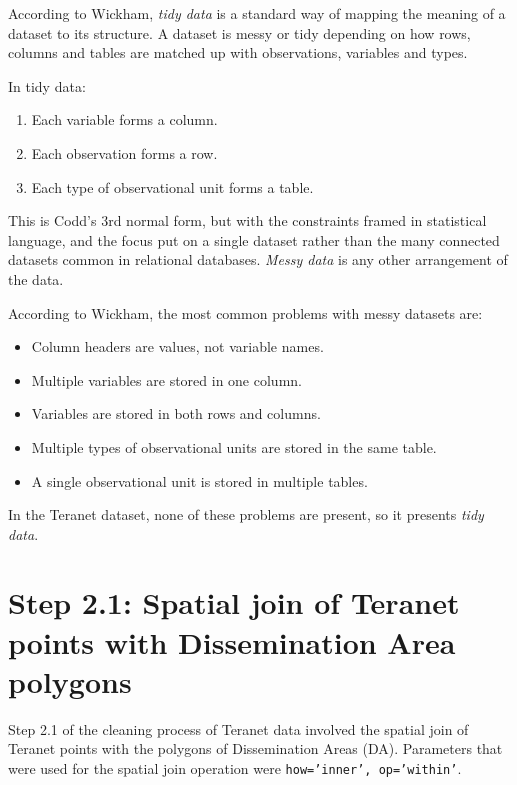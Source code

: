 \documentclass[11pt]{article}
\begin{document}
    According to Wickham\cite{Wickham2014}, \textit{tidy data} is a standard way of mapping the meaning of a dataset to its structure.
    A dataset is messy or tidy depending on how rows, columns and tables are matched up with observations,
    variables and types.

    \vspace{5mm}

    In tidy data:
    \begin{enumerate}
        \item Each variable forms a column.
        \item Each observation forms a row.
        \item Each type of observational unit forms a table.
    \end{enumerate}

    This is Codd's 3rd normal form\cite{Codd1990}, but with the constraints framed in statistical
    language, and the focus put on a single dataset rather than the many connected datasets common in relational databases.
    \textit{Messy data} is any other arrangement of the data.

    \vspace{5mm}

    According to Wickham, the most common problems with messy datasets are:
    \begin{itemize}
        \item Column headers are values, not variable names.
        \item Multiple variables are stored in one column.
        \item Variables are stored in both rows and columns.
        \item Multiple types of observational units are stored in the same table.
        \item A single observational unit is stored in multiple tables.
    \end{itemize}

    In the Teranet dataset, none of these problems are present, so it presents \textit{tidy data}.

    \section{Step 2.1: Spatial join of Teranet points with Dissemination Area polygons} \label{sec:teranet_da_spatial_join}

    Step 2.1 of the cleaning process of Teranet data involved the spatial join of Teranet points with the polygons of Dissemination Areas (DA).
    Parameters that were used for the spatial join operation were \texttt{how='inner', op='within'}.
\end{document}
